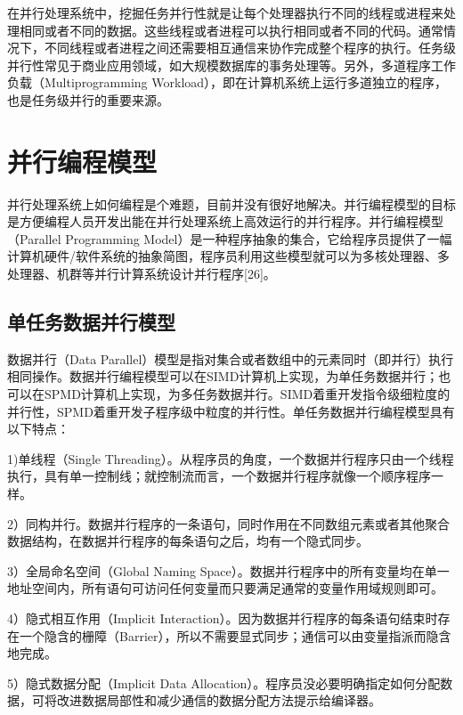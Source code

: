 \documentclass[]{ctexbook}
\begin{document}
在并行处理系统中，挖掘任务并行性就是让每个处理器执行不同的线程或进程来处理相同或者不同的数据。这些线程或者进程可以执行相同或者不同的代码。通常情况下，不同线程或者进程之间还需要相互通信来协作完成整个程序的执行。任务级并行性常见于商业应用领域，如大规模数据库的事务处理等。另外，多道程序工作负载（Multiprogramming Workload），即在计算机系统上运行多道独立的程序，也是任务级并行的重要来源。

\hypertarget{ux5e76ux884cux7f16ux7a0bux6a21ux578b}{%
\section{并行编程模型}\label{ux5e76ux884cux7f16ux7a0bux6a21ux578b}}

并行处理系统上如何编程是个难题，目前并没有很好地解决。并行编程模型的目标是方便编程人员开发出能在并行处理系统上高效运行的并行程序。并行编程模型（Parallel Programming Model）是一种程序抽象的集合，它给程序员提供了一幅计算机硬件/软件系统的抽象简图，程序员利用这些模型就可以为多核处理器、多处理器、机群等并行计算系统设计并行程序{[}26{]}。

\hypertarget{ux5355ux4efbux52a1ux6570ux636eux5e76ux884cux6a21ux578b}{%
\subsection{单任务数据并行模型}\label{ux5355ux4efbux52a1ux6570ux636eux5e76ux884cux6a21ux578b}}

数据并行（Data Parallel）模型是指对集合或者数组中的元素同时（即并行）执行相同操作。数据并行编程模型可以在SIMD计算机上实现，为单任务数据并行；也可以在SPMD计算机上实现，为多任务数据并行。SIMD着重开发指令级细粒度的并行性，SPMD着重开发子程序级中粒度的并行性。单任务数据并行编程模型具有以下特点：

1)单线程（Single Threading）。从程序员的角度，一个数据并行程序只由一个线程执行，具有单一控制线；就控制流而言，一个数据并行程序就像一个顺序程序一样。

2）同构并行。数据并行程序的一条语句，同时作用在不同数组元素或者其他聚合数据结构，在数据并行程序的每条语句之后，均有一个隐式同步。

3）全局命名空间（Global Naming Space）。数据并行程序中的所有变量均在单一地址空间内，所有语句可访问任何变量而只要满足通常的变量作用域规则即可。

4）隐式相互作用（Implicit Interaction）。因为数据并行程序的每条语句结束时存在一个隐含的栅障（Barrier），所以不需要显式同步；通信可以由变量指派而隐含地完成。

5）隐式数据分配（Implicit Data Allocation）。程序员没必要明确指定如何分配数据，可将改进数据局部性和减少通信的数据分配方法提示给编译器。
\end{document}
